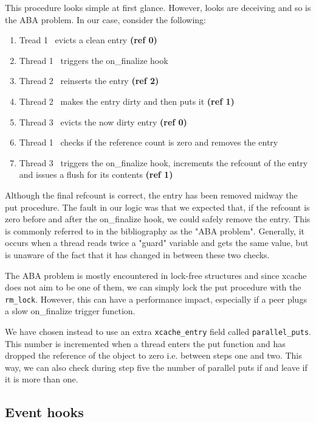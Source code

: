 This procedure looks simple at first glance. However, looks are deceiving and 
so is the ABA problem. In our case, consider the following:

\begin{enumerate}
	\item Tread 1 \textrightarrow\ evicts a clean entry \textbf{(ref 0)}
	\item Thread 1 \textrightarrow\ triggers the on\_finalize hook
	\item Thread 2 \textrightarrow\ reinserts the entry \textbf{(ref 2)}
	\item Thread 2 \textrightarrow\ makes the entry dirty and then puts it 
		\textbf{(ref 1)}
	\item Thread 3 \textrightarrow\ evicts the now dirty entry           
		\textbf{(ref 0)}
	\item Thread 1 \textrightarrow\ checks if the reference count is zero 
		and removes the entry
	\item Thread 3 \textrightarrow\ triggers the on\_finalize hook, 
		increments the refcount of the entry and issues a flush for its 
		contents
		\textbf{(ref 1)}
\end{enumerate}

Although the final refcount is correct, the entry has been removed midway the 
put procedure. The fault in our logic was that we expected that, if the 
refcount is zero before and after the on\_finalize hook, we could safely remove 
the entry. This is commonly referred to in the bibliography as the "ABA 
problem"\cite{aba}. Generally, it occurs when a thread reads twice a "guard" 
variable and gets the same value, but is unaware of the fact that it has 
changed in between these two checks.

The ABA problem is mostly encountered in lock-free structures and since xcache 
does not aim to be one of them, we can simply lock the put procedure with the 
\texttt{rm\_lock}. However, this can have a performance impact, especially if a 
peer plugs a slow on\_finalize trigger function.

We have chosen instead to use an extra \texttt{xcache\_entry} field called 
\texttt{parallel\_puts}.  This number is incremented when a thread enters the 
put function and has dropped the reference of the object to zero i.e. between 
steps one and two. This way, we can also check during step five the number of 
parallel puts if and leave if it is more than one.

\subsection{Event hooks}\label{sec:xcache-hooks-imp}

